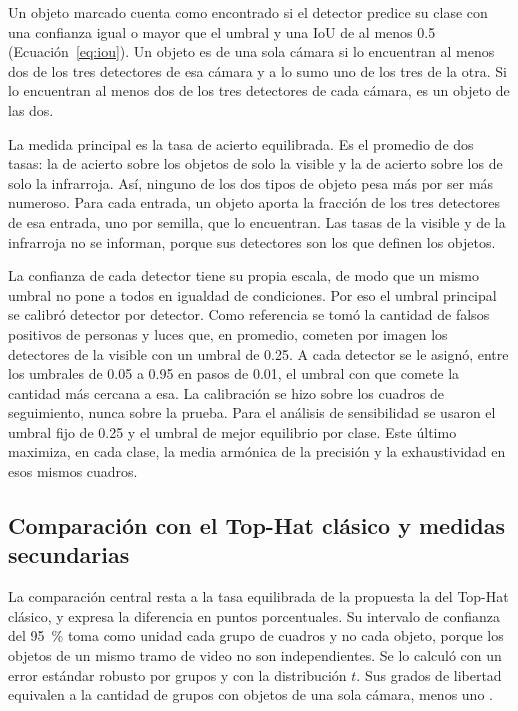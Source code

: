 Un objeto marcado cuenta como encontrado si el detector predice su clase con una confianza igual o
mayor que el umbral y una IoU de al menos 0.5 (Ecuación~\ref{eq:iou}). Un objeto es de una sola
cámara si lo encuentran al menos dos de los tres detectores de esa cámara y a lo sumo uno de los tres de
la otra. Si lo encuentran al menos dos de los tres detectores de cada cámara, es un objeto de las dos.

La medida principal es la tasa de acierto equilibrada. Es el promedio de dos tasas: la de acierto sobre
los objetos de solo la visible y la de acierto sobre los de solo la infrarroja. Así, ninguno de los dos
tipos de objeto pesa más por ser más numeroso. Para cada entrada, un objeto aporta la fracción de los
tres detectores de esa entrada, uno por semilla, que lo encuentran. Las tasas de la visible y de la infrarroja no
se informan, porque sus detectores son los que definen los objetos.

La confianza de cada detector tiene su propia escala, de modo que un mismo umbral no pone a todos en
igualdad de condiciones. Por eso el umbral principal se calibró detector por detector. Como referencia
se tomó la cantidad de falsos positivos de personas y luces que, en promedio, cometen por imagen los
detectores de la visible con un umbral de 0.25. A cada detector se le asignó, entre los umbrales de 0.05 a 0.95 en pasos de 0.01,
el umbral con que comete la cantidad más cercana a esa. La calibración se hizo sobre los cuadros de seguimiento, nunca sobre la prueba. Para el
análisis de sensibilidad se usaron el umbral fijo de 0.25 y el umbral de mejor equilibrio por clase. Este último
maximiza, en cada clase, la media armónica de la precisión y la exhaustividad en esos mismos cuadros.

\subsection{Comparación con el Top-Hat clásico y medidas secundarias}
\label{sec:det-comparacion}

La comparación central resta a la tasa equilibrada de la propuesta la del Top-Hat clásico, y expresa la
diferencia en puntos porcentuales. Su intervalo de confianza del 95~\% toma como unidad cada grupo de
cuadros y no cada objeto, porque los objetos de un mismo tramo de video no son independientes. Se lo
calculó con un error estándar robusto por grupos y con la distribución $t$. Sus grados de libertad
equivalen a la cantidad de grupos con objetos de una sola cámara, menos uno \parencite{cameron2015}.

